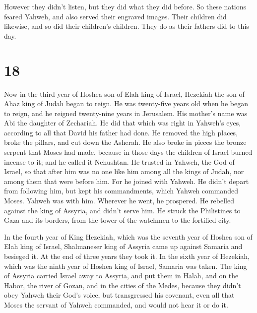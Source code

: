  However they didn't listen, but they did what they did
before.  So these nations feared Yahweh, and also served
their engraved images. Their children did likewise, and so did their
children's children. They do as their fathers did to this day.

\hypertarget{section-17}{%
\section{18}\label{section-17}}

 Now in the third year of Hoshea son of Elah king of
Israel, Hezekiah the son of Ahaz king of Judah began to reign.
 He was twenty-five years old when he began to reign, and
he reigned twenty-nine years in Jerusalem. His mother's name was Abi the
daughter of Zechariah.  He did that which was right in
Yahweh's eyes, according to all that David his father had done.
 He removed the high places, broke the pillars, and cut
down the Asherah. He also broke in pieces the bronze serpent that Moses
had made, because in those days the children of Israel burned incense to
it; and he called it Nehushtan.  He trusted in Yahweh, the
God of Israel, so that after him was no one like him among all the kings
of Judah, nor among them that were before him.  For he
joined with Yahweh. He didn't depart from following him, but kept his
commandments, which Yahweh commanded Moses.  Yahweh was
with him. Wherever he went, he prospered. He rebelled against the king
of Assyria, and didn't serve him.  He struck the
Philistines to Gaza and its borders, from the tower of the watchmen to
the fortified city.

 In the fourth year of King Hezekiah, which was the
seventh year of Hoshea son of Elah king of Israel, Shalmaneser king of
Assyria came up against Samaria and besieged it.  At the
end of three years they took it. In the sixth year of Hezekiah, which
was the ninth year of Hoshea king of Israel, Samaria was taken.
 The king of Assyria carried Israel away to Assyria, and
put them in Halah, and on the Habor, the river of Gozan, and in the
cities of the Medes,  because they didn't obey Yahweh
their God's voice, but transgressed his covenant, even all that Moses
the servant of Yahweh commanded, and would not hear it or do it.

